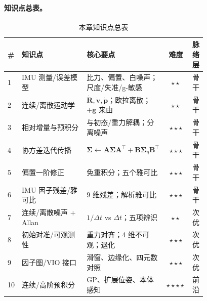 \paragraph{知识点总表。}
\begin{table}[H]\centering\small
\caption{本章知识点总表}
\begin{tabular}{p{0.04\linewidth}p{0.40\linewidth}p{0.34\linewidth}cc}
\toprule
\# & 知识点 & 核心要点 & 难度 & 脉络层 \\
\midrule
1 & IMU 测量/误差模型 & 比力、偏置、白噪声；尺度/失准/g-敏感 & \(\star\star\) & 骨干 \\
2 & 连续/离散运动学 & $\dot{\mathbf R},\dot{\mathbf v},\dot{\mathbf p}$；欧拉离散；$+\mathbf g$ 来由 & \(\star\star\) & 骨干 \\
3 & 相对增量与预积分 & 与初态/重力解耦；分离噪声 & \(\star\star\star\) & 骨干 \\
4 & 协方差迭代传播 & $\boldsymbol\Sigma\leftarrow\mathbf A\boldsymbol\Sigma\mathbf A^\top+\mathbf B\boldsymbol\Sigma_\eta\mathbf B^\top$ & \(\star\star\star\) & 骨干 \\
5 & 偏置一阶修正 & 免重积分；五个雅可比 & \(\star\star\star\) & 骨干 \\
6 & IMU 因子残差/雅可比 & $9$ 维残差；解析雅可比 & \(\star\star\star\) & 骨干 \\
7 & 连续/离散噪声 + Allan & $1/\Delta t$ vs $\Delta t$；五项辨识 & \(\star\star\) & 次优 \\
8 & 初始对准/可观测性 & 重力对齐；4 维不可观；退化 & \(\star\star\star\) & 次优 \\
9 & 因子图/VIO 接口 & 滑窗、边缘化、四元数对照 & \(\star\star\star\) & 次优 \\
10 & 连续/高阶预积分 & GP、扩展位姿、本体感知 & \(\star\star\star\star\) & 前沿 \\
\bottomrule
\end{tabular}
\end{table}


